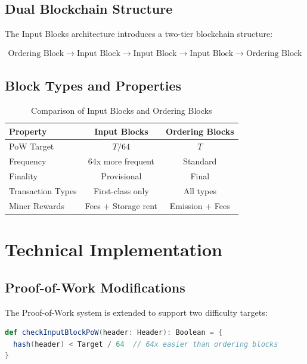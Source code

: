 \documentclass{llncs}
\begin{document}
\subsection{Dual Blockchain Structure}

The Input Blocks architecture introduces a two-tier blockchain structure:

\begin{align*}
\text{Ordering Block} \rightarrow \text{Input Block} \rightarrow \text{Input Block} \rightarrow \text{Input Block} \rightarrow \text{Ordering Block}
\end{align*}

\subsection{Block Types and Properties}

\begin{table}[h]
\centering
\begin{tabular}{lcc}
\hline
\textbf{Property} & \textbf{Input Blocks} & \textbf{Ordering Blocks} \\
\hline
PoW Target & $T/64$ & $T$ \\
Frequency & 64x more frequent & Standard \\
Finality & Provisional & Final \\
Transaction Types & First-class only & All types \\
Miner Rewards & Fees + Storage rent & Emission + Fees \\
\hline
\end{tabular}
\caption{Comparison of Input Blocks and Ordering Blocks}
\end{table}

\section{Technical Implementation}

\subsection{Proof-of-Work Modifications}

The Proof-of-Work system is extended to support two difficulty targets:

\begin{lstlisting}[language=Scala,caption=Input Block PoW Validation]
def checkInputBlockPoW(header: Header): Boolean = {
  hash(header) < Target / 64  // 64x easier than ordering blocks
}
\end{lstlisting}
\end{document}
